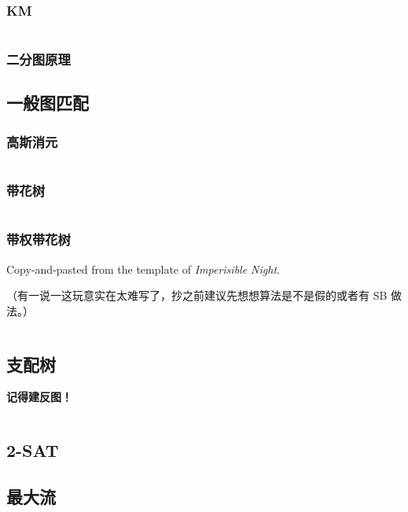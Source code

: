 \documentclass[a4paper, twoside]{article}
\begin{document}
\begin{multicols}{2}
				\subsubsection[KM 二分图最大权匹配]{KM}
					\inputminted{cpp}{../src/graph/KM二分图最大权匹配.cpp}

				\subsubsection{二分图原理}
					
			
			\subsection{一般图匹配}
				\subsubsection{高斯消元}
					
					\inputminted{cpp}{../src/graph/基于线性代数的一般图匹配.cpp}

				\subsubsection{带花树}
					\inputminted{cpp}{../src/graph/带花树.cpp}
				
				\subsubsection{带权带花树}
					Copy-and-pasted from the template of \textit{Imperisible Night}.

					（有一说一这玩意实在太难写了，抄之前建议先想想算法是不是假的或者有 SB 做法。）
					\inputminted{cpp}{../src/graph/带权带花树.cpp}

			\subsection{支配树}
				\textbf{记得建反图！}
				\inputminted{cpp}{../src/graph/支配树.cpp}

			\subsection{2-SAT}
				

			\subsection{最大流}

\end{multicols}
\end{document}
